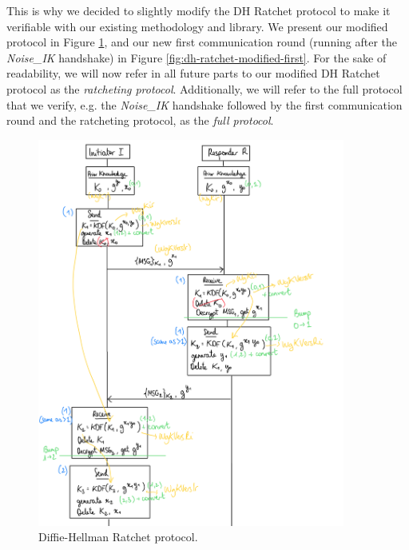 This is why we decided to slightly modify the DH Ratchet protocol to make it verifiable with our existing methodology and library.
We present our modified protocol in Figure \ref{fig:dh-ratchet-modified}, and our new first communication round (running after the \emph{Noise\_IK} handshake) in Figure \ref{fig:dh-ratchet-modified-first}.
For the sake of readability, we will now refer in all future parts to our modified DH Ratchet protocol as the \emph{ratcheting protocol}. Additionally, we will refer to the full protocol that we verify, e.g. the \emph{Noise\_IK} handshake followed by the first communication round and the ratcheting protocol, as the \emph{full protocol}.

\begin{figure}
    \centering
    \includegraphics[width=0.9\textwidth]{figures/DH-ratchet-modified.png}
    \caption{Diffie-Hellman Ratchet protocol.}
    \label{fig:dh-ratchet-modified}
\end{figure}

